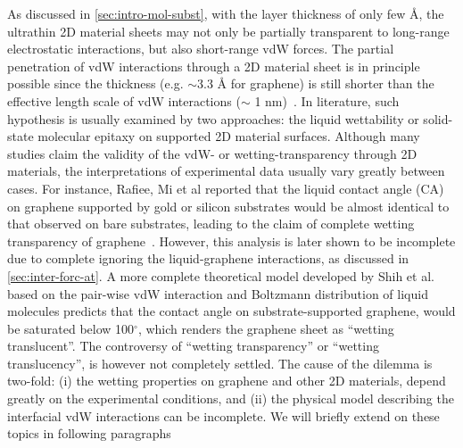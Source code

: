 As discussed in \autoref{sec:intro-mol-subst}, with the layer
thickness of only few \AA{}, the ultra\-thin 2D material sheets may
not only be partially transparent to long-range electrostatic
interactions, but also short-range vdW forces.
%
The partial penetration of vdW interactions through a 2D material
sheet is in principle possible since the thickness (e.g. $\sim{}$3.3
\AA{} for graphene) is still shorter than the effective length scale
of vdW interactions ($\sim{}$ 1 nm)~\cite{Israelachvili_2011_book}.
%
In literature, such hypothesis is usually examined by two approaches:
the liquid wettability or solid-state molecular epitaxy on supported
2D material surfaces.
%
Although many studies claim the validity of the vdW- or
wetting-transparency through 2D materials, the interpretations of
experimental data usually vary greatly between cases.
%
For instance, Rafiee, Mi et al reported that the liquid contact angle
(CA) on graphene supported by gold or silicon substrates would be
almost identical to that observed on bare substrates, leading to the
claim of complete wetting transparency of
graphene~\cite{rafiee_2012_transparency}.
%
However, this analysis is later shown to be incomplete due to complete
ignoring the liquid-graphene interactions, as discussed in
\autoref{sec:inter-forc-at}.
%
A more complete theoretical model developed by Shih et
al.~\cite{Shih_2012_prl}  based on the pair-wise
vdW interaction and Boltzmann distribution of liquid molecules
predicts that the contact angle on substrate-supported graphene, would
be saturated below 100$^{\circ}$, which renders the graphene sheet as
``wetting translucent''.
%
The controversy of ``wetting transparency'' or ``wetting
translucency'', is however not completely settled.
%
The cause of the dilemma is two-fold: (i) the wetting properties on
graphene and other 2D materials, depend greatly on the experimental
conditions, and (ii) the physical model describing the interfacial vdW
interactions can be incomplete. We will briefly extend on these topics
in following paragraphs

